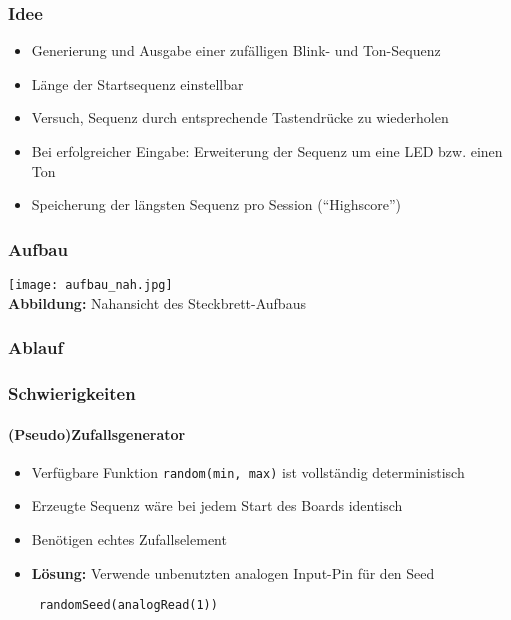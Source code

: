 \documentclass[xcolor=dvipsnames,10pt]{beamer}
\begin{document}
\begin{frame}\frametitle{Idee}
	\begin{itemize} \itemsep3ex
		\item Generierung und Ausgabe einer zufälligen Blink- und Ton-Sequenz 
		\item Länge der Startsequenz einstellbar
		\item Versuch, Sequenz durch entsprechende Tastendrücke zu wiederholen
		\item Bei erfolgreicher Eingabe: Erweiterung der Sequenz um eine LED bzw. einen Ton
		\item Speicherung der längsten Sequenz pro Session ("`Highscore"')
	\end{itemize}

\end{frame}





\begin{frame}\frametitle{Aufbau}
	\centering
	\texttt{[image: aufbau\_nah.jpg]} \\
	{\small \textbf{Abbildung:} Nahansicht des Steckbrett-Aufbaus}
\end{frame}





\begin{frame}\frametitle{Ablauf}
\end{frame}




\begin{frame}[fragile]\frametitle{Schwierigkeiten}\framesubtitle{(Pseudo)Zufallsgenerator}
	\begin{itemize}\itemsep3ex
		\item Verfügbare Funktion \verb|random(min, max)| ist vollständig deterministisch
		\item Erzeugte Sequenz wäre bei jedem Start des Boards identisch
		\item Benötigen echtes Zufallselement
		\item \textbf{Lösung:} Verwende unbenutzten analogen Input-Pin für den Seed
		\begin{verbatim} randomSeed(analogRead(1)) \end{verbatim}

	
	\end{itemize}

\end{frame}
\end{document}
